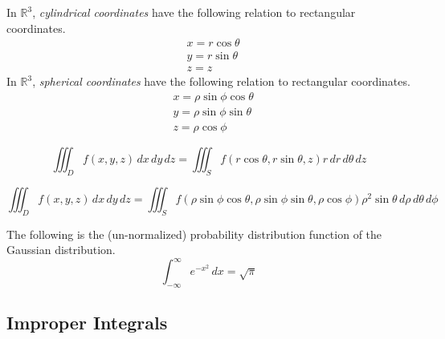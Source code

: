   \begin{definition}
    \label{def:cylindrical-spherical-coordinates}
  In $\mathbb{R}^3$, \textit{cylindrical coordinates} have the following relation to rectangular coordinates. 
  \begin{align}
      & x = r \cos{\theta} \\
      & y = r \sin{\theta} \\
      & z = z
  \end{align}
  In $\mathbb{R}^3$, \textit{spherical coordinates} have the following relation to rectangular coordinates. 
  \begin{align*}
      & x = \rho \sin{\phi} \cos{\theta} \\
      & y = \rho \sin{\phi} \sin{\theta} \\
      & z = \rho \cos{\phi}
  \end{align*}
  \end{definition}

  \begin{corollary}
    \label{thm:integration-in-cylindrical-coordinates}
  \begin{equation}
    \iiint_D f(x, y, z) \, dx \, dy \, dz = \iiint_S f( r \cos{\theta}, r \sin{\theta}, z) r \, dr \, d\theta \, dz
  \end{equation}
  \end{corollary}

  \begin{corollary}
    \label{thm:integration-in-spherical-coordinates}
  \begin{equation}
    \iiint_D f(x, y, z) \,dx\,dy\,dz = \iiint_S f(\rho \sin{\phi} \cos{\theta}, \rho \sin{\phi} \sin{\theta}, \rho \cos{\phi}) \rho^2 \sin{\theta} \, d\rho \, d\theta \, d\phi
  \end{equation}
  \end{corollary}

  \begin{example}
    \label{ex:gaussian-integral}
  The following is the (un-normalized) probability distribution function of the Gaussian distribution. 
  \begin{equation}
    \int_{-\infty}^{\infty} e^{-x^2} \, dx = \sqrt{\pi}
  \end{equation}
  \end{example}

\subsection{Improper Integrals}

